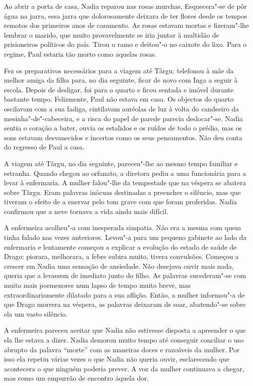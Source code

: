 \bigskip

Ao abrir a porta de casa, Nadia reparou nas rosas murchas.
Esquecera"-se de pôr água na jarra, essa jarra que dolorosamente deixara
de ter flores desde os tempos remotos dos primeiros anos de casamento.
As rosas estavam mortas e fizeram"-lhe lembrar o marido, que muito provavelmente se iria juntar à multidão de prisioneiros políticos
do país. Tirou o ramo e deitou"-o no caixote do lixo. Para o regime, Paul
estaria tão morto como aquelas rosas.

Fez os preparativos necessários para a viagem até Târgu: telefonou à mãe
da melhor amiga da filha para, no dia seguinte, ficar de novo com Inga a
seguir à escola. Depois de desligar, foi para o quarto e ficou sentada e
imóvel durante bastante tempo. Felizmente, Paul não estava em casa. Os
objectos do quarto oscilavam com a sua fadiga, cintilavam auréolas de
luz à volta do candeeiro da mesinha"-de"-cabeceira, e a risca do papel de
parede parecia deslocar"-se. Nadia sentia o coração a bater, ouvia os
estalidos e os ruídos de todo o prédio, mas os sons estavam desvanecidos
e incertos como os seus pensamentos. Não deu conta do regresso de Paul
a casa.

A viagem até Târgu, no dia seguinte, pareceu"-lhe ao mesmo tempo familiar
e estranha. Quando chegou ao orfanato, a diretora pediu a uma
funcionária para a levar à enfermaria. A mulher falou"-lhe da tempestade
que na véspera se abatera sobre Târgu. Eram palavras inócuas destinadas
a preencher o silêncio, mas que tiveram o efeito de a enervar pelo tom
grave com que foram proferidas. Nadia confirmou que a neve tornava a
vida ainda mais difícil.

A enfermeira acolheu"-a com inesperada simpatia. Não era a mesma com quem
tinha falado nas vezes anteriores. Levou"-a para um pequeno gabinete ao
lado da enfermaria e lentamente começou a explicar a evolução do estado
de saúde de Drago: piorara, melhorara, a febre subira muito, tivera
convulsões. Começou a crescer em Nadia uma sensação de ansiedade. Não
desejava ouvir mais nada, queria
que a levassem de imediato junto do filho. As palavras sucederam"-se com
muito mais pormenores num lapso de tempo muito breve, mas
extraordinariamente dilatado para a sua aflição. Então, a mulher
informou"-a de que Drago morrera na véspera, as palavras deixaram de
soar, abatendo"-se sobre ela um vasto silêncio.

A enfermeira pareceu aceitar que Nadia não estivesse disposta a
apreender o que ela lhe estava a dizer. Nadia demorou muito tempo até
conseguir conciliar o uso abrupto da palavra ``morte'' com as maneiras
doces e razoáveis da mulher. Por isso ela repetiu várias vezes o que
Nadia não queria ouvir, esclarecendo que acontecera o que ninguém
poderia prever. A voz da mulher continuava a chegar, mas como um
empurrão de encontro àquela dor.

